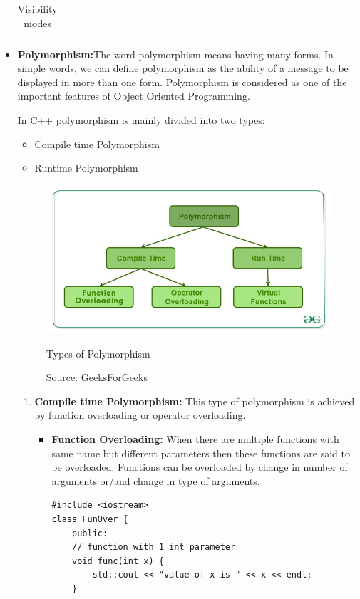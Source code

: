 \documentclass[main]{subfiles}
\begin{document}
\begin{itemize}
\begin{center}
\begin{table}[H]
\begin{tabular}{|c|c|c|c|}
        \end{tabular}
        \caption{Visibility modes}
        \label{tab:Visibility modes}
    \end{table}
    \end{center}
    
    \item\textbf{Polymorphism:}The word polymorphism means having many forms. In simple words, we can define polymorphism as the ability of a message to be displayed in more than one form. Polymorphism is considered as one of the important features of Object Oriented Programming.
    
    In C++ polymorphism is mainly divided into two types:
    \begin{itemize}
        \item Compile time Polymorphism
        \item Runtime Polymorphism
    \end{itemize}
    
    \begin{figure}[H]
        \includegraphics[width=\textwidth]{graphics/Polymorphism-in-CPP.png}
        \caption{Types of Polymorphism}
        \label{fig:Polymorphism}
        \caption*{Source: \href{https://www.geeksforgeeks.org/}{GeeksForGeeks}}
    \end{figure}
    
    
    \begin{enumerate}
        \item \textbf{Compile time Polymorphism:} This type of polymorphism is achieved by function overloading or operator overloading.
        \begin{itemize}
            \item\textbf{Function Overloading:} When there are multiple functions with same name but different parameters then these functions are said to be overloaded. Functions can be overloaded by change in number of arguments or/and change in type of arguments.
            \begin{verbatim}
#include <iostream> 
class FunOver { 
    public: 
    // function with 1 int parameter 
    void func(int x) { 
        std::cout << "value of x is " << x << endl; 
    } 
      

\end{verbatim}
\end{itemize}
\end{enumerate}
\end{itemize}
\end{document}
